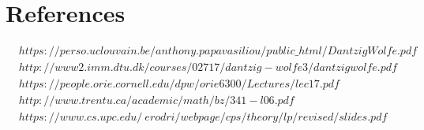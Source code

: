 \documentclass[a4paper,12pt]{article}
\begin{document}
\section{References}
\begin{align*}
&https://perso.uclouvain.be/anthony.papavasiliou/public\_html/DantzigWolfe.pdf\\
&http://www2.imm.dtu.dk/courses/02717/dantzig-wolfe3/dantzigwolfe.pdf\\
&https://people.orie.cornell.edu/dpw/orie6300/Lectures/lec17.pdf\\
&http://www.trentu.ca/academic/math/bz/341-l06.pdf\\
&https://www.cs.upc.edu/~erodri/webpage/cps/theory/lp/revised/slides.pdf
\end{align*}
\end{document}
